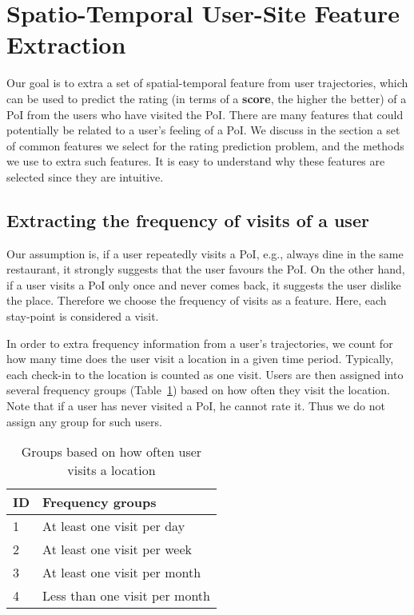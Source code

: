 \section{Spatio-Temporal User-Site Feature Extraction}
\label{sec:method}

Our goal is to extra a set of spatial-temporal feature from user trajectories, which can be used to predict the rating (in terms of a \textbf{score}, the higher the better) of a PoI from the users who have visited the PoI. There are many features that could potentially be related to a user's feeling of a PoI. We discuss in the section a set of common features we select for the rating prediction problem, and the methods we use to extra such features. It is easy to understand why these features are selected since they are intuitive.

\subsection{Extracting the frequency of visits of a user}

Our assumption is, if a user repeatedly visits a PoI, e.g., always dine in the same restaurant, it strongly suggests that the user favours the PoI. On the other hand, if a user visits a PoI only once and never comes back, it suggests the user dislike the place. Therefore we choose the frequency of visits as a feature. Here, each stay-point is considered a visit.

In order to extra frequency information from a user's trajectories, we count for how many time does the user visit a location in a given time period. Typically, each check-in to the location is counted as one visit. Users are then assigned into several frequency groups (Table~\ref{frequencyGroups}) based on how often they visit the location. Note that if a user has never visited a PoI, he cannot rate it. Thus we do not assign any group for such users.

\begin{table}[htbp]
\begin{center}
\caption{Groups based on how often user visits a location \label{frequencyGroups}}
\begin{tabular}{|l|l|} \hline
ID & \textbf{Frequency groups} \\ \hline
1 & At least one visit per day \\ \hline
2 & At least one visit per week \\ \hline
3 & At least one visit per month \\ \hline
4 & Less than one visit per month \\ \hline
\end{tabular}
\end{center}
\end{table}

